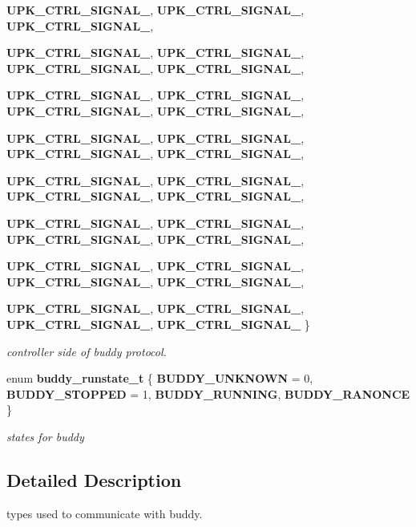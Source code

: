 \begin{DoxyCompactItemize}
{\bf UPK\_\-CTRL\_\-SIGNAL\_}, 
{\bf UPK\_\-CTRL\_\-SIGNAL\_}, 
{\bf UPK\_\-CTRL\_\-SIGNAL\_}, 
\par
{\bf UPK\_\-CTRL\_\-SIGNAL\_}, 
{\bf UPK\_\-CTRL\_\-SIGNAL\_}, 
{\bf UPK\_\-CTRL\_\-SIGNAL\_}, 
{\bf UPK\_\-CTRL\_\-SIGNAL\_}, 
\par
{\bf UPK\_\-CTRL\_\-SIGNAL\_}, 
{\bf UPK\_\-CTRL\_\-SIGNAL\_}, 
{\bf UPK\_\-CTRL\_\-SIGNAL\_}, 
{\bf UPK\_\-CTRL\_\-SIGNAL\_}, 
\par
{\bf UPK\_\-CTRL\_\-SIGNAL\_}, 
{\bf UPK\_\-CTRL\_\-SIGNAL\_}, 
{\bf UPK\_\-CTRL\_\-SIGNAL\_}, 
{\bf UPK\_\-CTRL\_\-SIGNAL\_}, 
\par
{\bf UPK\_\-CTRL\_\-SIGNAL\_}, 
{\bf UPK\_\-CTRL\_\-SIGNAL\_}, 
{\bf UPK\_\-CTRL\_\-SIGNAL\_}, 
{\bf UPK\_\-CTRL\_\-SIGNAL\_}, 
\par
{\bf UPK\_\-CTRL\_\-SIGNAL\_}, 
{\bf UPK\_\-CTRL\_\-SIGNAL\_}, 
{\bf UPK\_\-CTRL\_\-SIGNAL\_}, 
{\bf UPK\_\-CTRL\_\-SIGNAL\_}, 
\par
{\bf UPK\_\-CTRL\_\-SIGNAL\_}, 
{\bf UPK\_\-CTRL\_\-SIGNAL\_}, 
{\bf UPK\_\-CTRL\_\-SIGNAL\_}, 
{\bf UPK\_\-CTRL\_\-SIGNAL\_}, 
\par
{\bf UPK\_\-CTRL\_\-SIGNAL\_}, 
{\bf UPK\_\-CTRL\_\-SIGNAL\_}, 
{\bf UPK\_\-CTRL\_\-SIGNAL\_}, 
{\bf UPK\_\-CTRL\_\-SIGNAL\_}
 \}
\begin{DoxyCompactList}\small\item\em controller side of buddy protocol. \end{DoxyCompactList}\item 
enum {\bf buddy\_\-runstate\_\-t} \{ {\bf BUDDY\_\-UNKNOWN} =  0, 
{\bf BUDDY\_\-STOPPED} =  1, 
{\bf BUDDY\_\-RUNNING}, 
{\bf BUDDY\_\-RANONCE}
 \}
\begin{DoxyCompactList}\small\item\em states for buddy \end{DoxyCompactList}\end{DoxyCompactItemize}


\subsection{Detailed Description}
types used to communicate with buddy. 